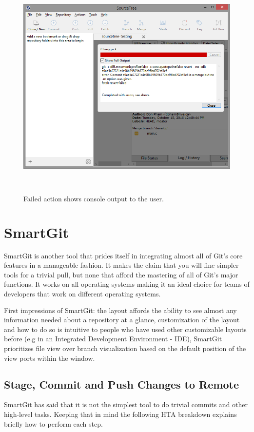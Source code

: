 \documentclass{sigchi}
\begin{document}
\begin{figure}
  \centering
  \includegraphics[width=1.75\columnwidth]{figures/SourceTree/failed_task_shows_git_command}
  \caption{Failed action shows console output to the user.}~\label{fig:SourceTreeFailOutput}
\end{figure}



\section{SmartGit}
SmartGit is another tool that prides itself in integrating almost all of Git's core features in a manageable fashion.
It makes the claim that you will fine simpler tools for a trivial pull, but none that afford the mastering of all of Git's major
functions. It works on all operating systems making it an ideal choice for teams of developers that work on different
operating systems. 

First impressions of SmartGit: the layout affords the ability to see almost any information needed about a repository at a glance,
customization of the layout and how to do so is intuitive to people who have used other customizable layouts before
(e.g in an Integrated Development Environment - IDE), SmartGit prioritizes file view over branch visualization based on the 
default position of the view ports within the window. 

\subsection{Stage, Commit and Push Changes to Remote}
SmartGit has said that it is not the simplest tool to do trivial commits and other high-level tasks.
Keeping that in mind the following HTA breakdown explains briefly how to perform each step.
\end{document}
